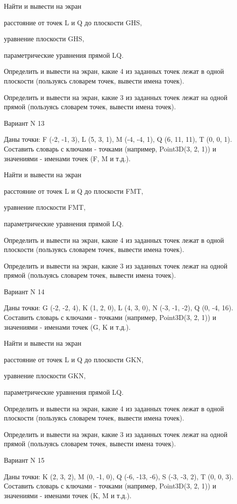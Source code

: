 \documentclass[11pt]{report}
\begin{document}
Найти и вывести на экран


расстояние от точек L и Q до плоскости GHS,


уравнение плоскости GHS,


параметрические уравнения прямой LQ.


Определить и вывести на экран, какие 4 из заданных точек лежат в одной плоскости (пользуясь словарем точек, вывести имена точек).


Определить и вывести на экран, какие 3 из заданных точек лежат на одной прямой (пользуясь словарем точек, вывести имена точек).

\newpage
Вариант N 13

Даны точки: F (-2, -1, 3), L (5, 3, 1), M (-4, -4, 1), Q (6, 11, 11), T (0, 0, 1).
Составить словарь с ключами - точками (например, Point3D(3, 2, 1)) и значениями - именами точек (F, M и т.д.).


Найти и вывести на экран


расстояние от точек L и Q до плоскости FMT,


уравнение плоскости FMT,


параметрические уравнения прямой LQ.


Определить и вывести на экран, какие 4 из заданных точек лежат в одной плоскости (пользуясь словарем точек, вывести имена точек).


Определить и вывести на экран, какие 3 из заданных точек лежат на одной прямой (пользуясь словарем точек, вывести имена точек).

\newpage
Вариант N 14

Даны точки: G (-2, -2, 4), K (1, 2, 0), L (4, 3, 0), N (-3, -1, -2), Q (0, -4, 16).
Составить словарь с ключами - точками (например, Point3D(3, 2, 1)) и значениями - именами точек (G, K и т.д.).


Найти и вывести на экран


расстояние от точек L и Q до плоскости GKN,


уравнение плоскости GKN,


параметрические уравнения прямой LQ.


Определить и вывести на экран, какие 4 из заданных точек лежат в одной плоскости (пользуясь словарем точек, вывести имена точек).


Определить и вывести на экран, какие 3 из заданных точек лежат на одной прямой (пользуясь словарем точек, вывести имена точек).

\newpage
Вариант N 15

Даны точки: K (2, 3, 2), M (0, -1, 0), Q (-6, -13, -6), S (-3, -3, 2), T (0, 0, 3).
Составить словарь с ключами - точками (например, Point3D(3, 2, 1)) и значениями - именами точек (K, M и т.д.).
\end{document}
